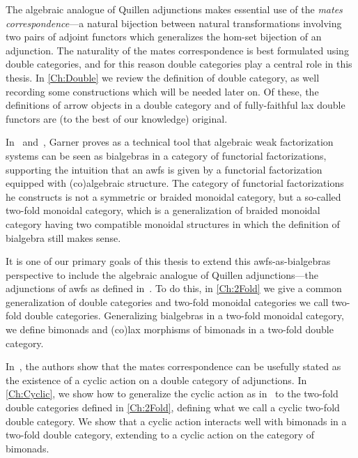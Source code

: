 The algebraic analogue of Quillen adjunctions makes essential use of the \emph{mates correspondence}---a natural bijection between natural transformations involving two pairs of adjoint functors which generalizes the hom-set bijection of an adjunction. The naturality of the mates correspondence is best formulated using double categories, and for this reason double categories play a central role in this thesis. In \cref{Ch:Double} we review the definition of double category, as well recording some constructions which will be needed later on. Of these, the definitions of arrow objects in a double category and of fully-faithful lax double functors are (to the best of our knowledge) original.

In~\cite{garner:nwfs} and~\cite{garner:soa}, Garner proves as a technical tool that algebraic weak factorization systems can be seen as bialgebras in a category of functorial factorizations, supporting the intuition that an awfs is given by a functorial factorization equipped with (co)algebraic structure. The category of functorial factorizations he constructs is not a symmetric or braided monoidal category, but a so-called two-fold monoidal category, which is a generalization of braided monoidal category having two compatible monoidal structures in which the definition of bialgebra still makes sense.

It is one of our primary goals of this thesis to extend this awfs-as-bialgebras perspective to include the algebraic analogue of Quillen adjunctions---the adjunctions of awfs as defined in~\cite{riehl:nwfs-model}. To do this, in \cref{Ch:2Fold} we give a common generalization of double categories and two-fold monoidal categories we call two-fold double categories. Generalizing bialgebras in a two-fold monoidal category, we define bimonads and (co)lax morphisms of bimonads in a two-fold double category.

In~\cite{cgr:mates}, the authors show that the mates correspondence can be usefully stated as the existence of a cyclic action on a double category of adjunctions. In \cref{Ch:Cyclic}, we show how to generalize the cyclic action as in~\cite{cgr:mates} to the two-fold double categories defined in \cref{Ch:2Fold}, defining what we call a cyclic two-fold double category. We show that a cyclic action interacts well with bimonads in a two-fold double category, extending to a cyclic action on the category of bimonads. 

